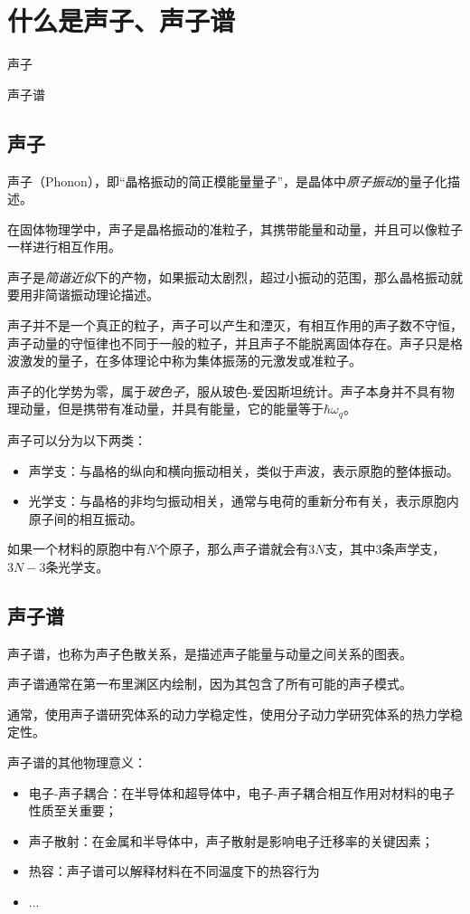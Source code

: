 \section{什么是声子、声子谱} \label{sec:什么是声子、声子谱}


\begin{Abstract}
    \item 声子
    \item 声子谱
\end{Abstract}

\subsection{声子}\label{subsec:什么是声子、声子谱-声子}

声子（Phonon），即“晶格振动的简正模能量量子”，是晶体中\emph{原子振动}的量子化描述。

在固体物理学中，声子是晶格振动的准粒子，其携带能量和动量，并且可以像粒子一样进行相互作用。

声子是\emph{简谐近似}下的产物，如果振动太剧烈，超过小振动的范围，那么晶格振动就要用非简谐振动理论描述。

声子并不是一个真正的粒子，声子可以产生和湮灭，有相互作用的声子数不守恒，声子动量的守恒律也不同于一般的粒子，并且声子不能脱离固体存在。声子只是格波激发的量子，在多体理论中称为集体振荡的元激发或准粒子。

声子的化学势为零，属于\emph{玻色子}，服从玻色-爱因斯坦统计。声子本身并不具有物理动量，但是携带有准动量，并具有能量，它的能量等于$\hbar\omega_q$。

声子可以分为以下两类：
\begin{itemize}
    \item 声学支：与晶格的纵向和横向振动相关，类似于声波，表示原胞的整体振动。
    \item 光学支：与晶格的非均匀振动相关，通常与电荷的重新分布有关，表示原胞内原子间的相互振动。
\end{itemize}

如果一个材料的原胞中有$N$个原子，那么声子谱就会有$3N$支，其中3条声学支，$3N-3$条光学支。

\subsection{声子谱}\label{subsec:什么是声子、声子谱-声子谱}

声子谱，也称为声子色散关系，是描述声子能量与动量之间关系的图表。

声子谱通常在第一布里渊区内绘制，因为其包含了所有可能的声子模式。

通常，使用声子谱研究体系的动力学稳定性，使用分子动力学研究体系的热力学稳定性。

声子谱的其他物理意义：
\begin{itemize}
    \item 电子-声子耦合：在半导体和超导体中，电子-声子耦合相互作用对材料的电子性质至关重要；
    \item 声子散射：在金属和半导体中，声子散射是影响电子迁移率的关键因素；
    \item 热容：声子谱可以解释材料在不同温度下的热容行为
    \item ...
\end{itemize}

